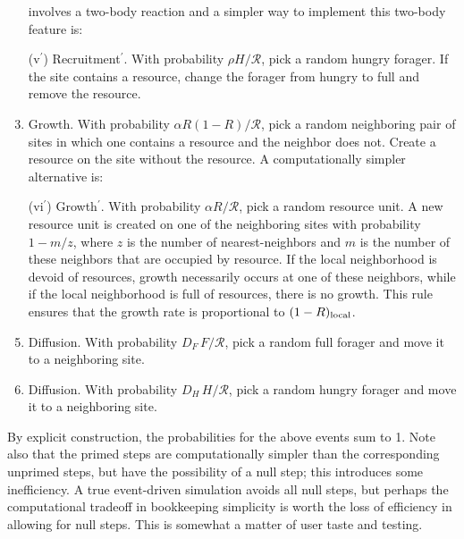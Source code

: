 \documentclass[11pt]{iopart}
\begin{document}
\begin{enumerate}
  involves a two-body reaction and a simpler way to implement this two-body
  feature is:
\item[(v$^\prime$)] Recruitment$^\prime$.  With probability
  $\rho H/\mathcal{R}$, pick a random hungry forager.  If the site contains a
  resource, change the forager from hungry to full and remove the resource.
\item Growth.  With probability $\alpha R(1-R)/\mathcal{R}$, pick a random
  neighboring pair of sites in which one contains a resource and the neighbor
  does not.  Create a resource on the site without the resource.  A
  computationally simpler alternative is:
\item[(vi$^\prime$)] Growth$^\prime$.  With probability
  $\alpha R/\mathcal{R}$, pick a random resource unit.  A new resource unit
  is created on one of the neighboring sites with probability $1-m/z$, where
  $z$ is the number of nearest-neighbors and $m$ is the number of these
  neighbors that are occupied by resource.  If the local neighborhood is
  devoid of resources, growth necessarily occurs at one of these neighbors,
  while if the local neighborhood is full of resources, there is no growth.
  This rule ensures that the growth rate is proportional to
  $(1-R)_{\rm local}$.
\item Diffusion.  With probability $D_F\, F/\mathcal{R}$, pick a random full
  forager and move it to a neighboring site.
\item Diffusion.  With probability $D_H\, H/\mathcal{R}$, pick a random
  hungry forager and move it to a neighboring site.
\end{enumerate}
By explicit construction, the probabilities for the above events sum to 1.
Note also that the primed steps are computationally simpler than the
corresponding unprimed steps, but have the possibility of a null step; this
introduces some inefficiency.  A true event-driven simulation avoids all null
steps, but perhaps the computational tradeoff in bookkeeping simplicity is
worth the loss of efficiency in allowing for null steps.  This is somewhat a
matter of user taste and testing.
\end{document}
